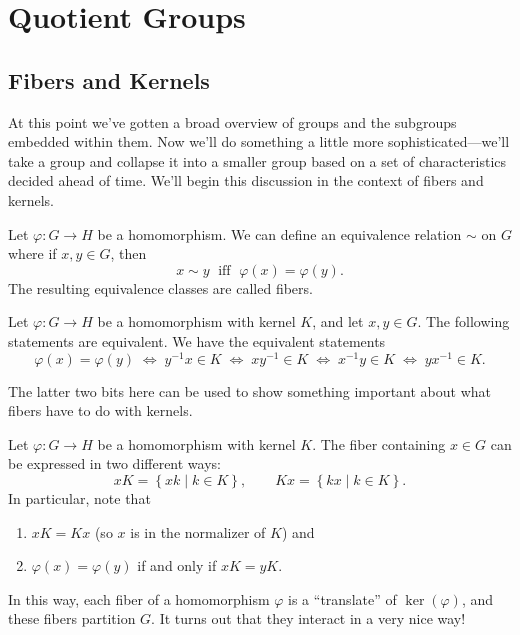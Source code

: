 \documentclass[../m171main.tex]{subfiles}
\begin{document}
\chapter{Quotient Groups}
\section{Fibers and Kernels}
At this point we've gotten a broad overview of groups and the subgroups embedded within them.
Now we'll do something a little more sophisticated---we'll take a group and collapse it into a smaller group based on a set of characteristics decided ahead of time.
We'll begin this discussion in the context of fibers and kernels.

\begin{definition}[Fiber]
    Let $\varphi : G \to H$ be a homomorphism.
    We can define an equivalence relation $\sim$ on $G$ where if $x,y \in G$, then
    \[ x \sim y \;\textrm{ iff }\; \varphi(x) = \varphi(y). \]
    The resulting equivalence classes are called fibers.
\end{definition}

\begin{theorem}[]
    Let $\varphi : G \to H$ be a homomorphism with kernel $K$, and let $x,y \in G$.
    The following statements are equivalent.
    We have the equivalent statements
    \[ \varphi(x) = \varphi(y) \;\iff\; y^{-1} x \in K \;\iff\; xy^{-1} \in K \;\iff\; x^{-1}y \in K \;\iff\; yx^{-1} \in K. \]
\end{theorem}

The latter two bits here can be used to show something important about what fibers have to do with kernels.

\begin{theorem}[]
    Let $\varphi : G \to H$ be a homomorphism with kernel $K$.
    The fiber containing $x \in G$ can be expressed in two different ways:
    \[ xK = \left\{ xk \;|\; k \in K \right\}, \qquad Kx = \left\{ kx \;|\; k \in K \right\}. \]
    In particular, note that
    \begin{enumerate}[label=(\alph*)]
        \item $xK = Kx$ (so $x$ is in the normalizer of $K$) and
        \item $\varphi(x) = \varphi(y)$ if and only if $xK = yK$.
    \end{enumerate}
\end{theorem}

In this way, each fiber of a homomorphism $\varphi$ is a ``translate'' of $\ker(\varphi)$, and these fibers partition $G$.
It turns out that they interact in a very nice way!
\end{document}
